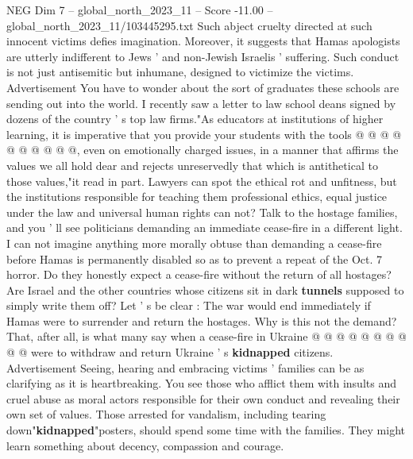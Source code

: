 \begin{textsample}{NEG Dim 7 – global\_north\_2023\_11 – Score -11.00 – global\_north\_2023\_11/103445295.txt}
Such abject cruelty directed at such innocent victims defies imagination.
Moreover, it suggests that Hamas apologists are utterly indifferent to Jews ' and non-Jewish Israelis ' suffering.
Such conduct is not just antisemitic but inhumane, designed to victimize the victims.
Advertisement You have to wonder about the sort of graduates these schools are sending out into the world.
I recently saw a letter to law school deans signed by dozens of the country ' s top law firms."As educators at institutions of higher learning, it is imperative that you provide your students with the tools @ @ @ @ @ @ @ @ @ @, even on emotionally charged issues, in a manner that affirms the values we all hold dear and rejects unreservedly that which is antithetical to those values,"it read in part.
Lawyers can spot the ethical rot and unfitness, but the institutions responsible for teaching them professional ethics, equal justice under the law and universal human rights can not?
Talk to the hostage families, and you ' ll see politicians demanding an immediate cease-fire in a different light.
I can not imagine anything more morally obtuse than demanding a cease-fire before Hamas is permanently disabled so as to prevent a repeat of the Oct. 7 horror.
Do they honestly expect a cease-fire without the return of all hostages?
Are Israel and the other countries whose citizens sit in dark \textbf{tunnels} supposed to simply write them off?
Let ' s be clear : The war would end immediately if Hamas were to surrender and return the hostages.
Why is this not the demand?
That, after all, is what many say when a cease-fire in Ukraine @ @ @ @ @ @ @ @ @ @ were to withdraw and return Ukraine ' s \textbf{kidnapped} citizens.
Advertisement Seeing, hearing and embracing victims ' families can be as clarifying as it is heartbreaking.
You see those who afflict them with insults and cruel abuse as moral actors responsible for their own conduct and revealing their own set of values.
Those arrested for vandalism, including tearing down"\textbf{kidnapped}"posters, should spend some time with the families.
They might learn something about decency, compassion and courage.

\end{textsample}

